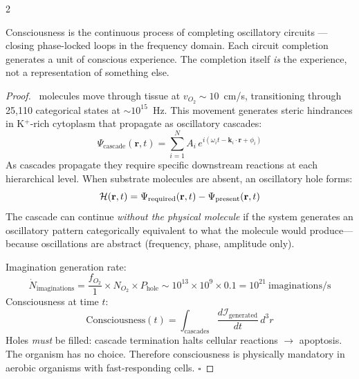 \begin{multicols}{2}

\begin{theorem}
\label{thm:consciousness_mechanism}
Consciousness is the continuous process of completing oscillatory circuits
---closing phase-locked loops in the frequency domain.  Each circuit
completion generates a unit of conscious experience.  The completion itself
\emph{is} the experience, not a representation of something else.
\end{theorem}

\begin{proof}
\Otwo\ molecules move through tissue at $v_{O_2} \sim 10$~cm/s, transitioning
through 25,110 categorical states at ${\sim}10^{15}$~Hz.  This movement
generates steric hindrances in K$^+$-rich cytoplasm that propagate as
oscillatory cascades:
\begin{equation}
\Psi_{\text{cascade}}(\mathbf{r},t)
  = \sum_{i=1}^{N} A_i\,e^{i(\omega_i t - \mathbf{k}_i\cdot\mathbf{r} + \phi_i)}
\end{equation}
As cascades propagate they require specific downstream reactions at each
hierarchical level.  When substrate molecules are absent, an oscillatory
hole forms:
\begin{equation}
\mathcal{H}(\mathbf{r},t)
  = \Psi_{\text{required}}(\mathbf{r},t) - \Psi_{\text{present}}(\mathbf{r},t)
\end{equation}
The cascade can continue \emph{without the physical molecule} if the system
generates an oscillatory pattern categorically equivalent to what the
molecule would produce---because oscillations are abstract (frequency,
phase, amplitude only).

Imagination generation rate:
\begin{equation}
\dot{N}_{\text{imaginations}}
  = \frac{f_{O_2}}{1}\times N_{O_2}\times P_{\text{hole}}
  \sim 10^{13}\times 10^9\times 0.1
  = 10^{21}~\text{imaginations/s}
\end{equation}
Consciousness at time $t$:
\begin{equation}
\text{Consciousness}(t)
  = \int_{\text{cascades}} \frac{d\mathcal{I}_{\text{generated}}}{dt}\,d^3r
\end{equation}
Holes \emph{must} be filled: cascade termination halts cellular reactions
$\to$ apoptosis.  The organism has no choice.  Therefore consciousness is
physically mandatory in aerobic organisms with fast-responding cells.
$\square$
\end{proof}


\end{multicols}
